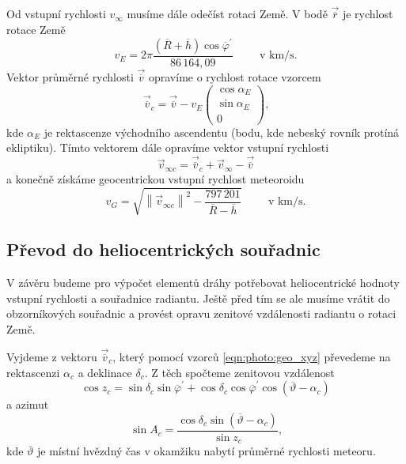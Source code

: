 Od vstupní rychlosti $v_\infty$ musíme dále odečíst rotaci Země. V bodě $\vec{\overline{r}}$ je rychlost rotace Země \cite{ceplecha}
\begin{equation}
    v_E=2\pi\frac{(\overline{R}+\overline{h})\cos{\overline{\varphi}^\prime}}{86\,164{,}09}\hspace{1cm}\text{v km/s.}
\end{equation}
Vektor průměrné rychlosti $\vec{\overline{v}}$ opravíme o rychlost rotace vzorcem \cite{ceplecha}
\begin{equation}
    \vec{\overline{v}}_c=\vec{\overline{v}}-v_E\begin{pmatrix}
        \cos{\alpha_E} \\
        \sin{\alpha_E} \\
        0
    \end{pmatrix}\text{,}
\end{equation}
kde $\alpha_E$ je rektascenze východního ascendentu (bodu, kde nebeský rovník protíná ekliptiku). Tímto vektorem dále opravíme vektor vstupní rychlosti \cite{ceplecha}
\begin{equation}
    \vec{v}_{\infty c}=\vec{\overline{v}}_c+\vec{v}_\infty-\vec{\overline{v}}
\end{equation}
a konečně získáme geocentrickou vstupní rychlost meteoroidu \cite{ceplecha}
\begin{equation}
    v_G=\sqrt{
        \left\lVert\vec{v}_{\infty c}\right\rVert^2-
        \frac{797\,201}{\overline{R}-\overline{h}}
    }\hspace{1cm}\text{v km/s.}
\end{equation}

\subsection{Převod do heliocentrických souřadnic}%
V závěru budeme pro výpočet elementů dráhy potřebovat heliocentrické hodnoty vstupní rychlosti a souřadnice radiantu. Ještě před tím se ale musíme vrátit do obzorníkových souřadnic a provést opravu zenitové vzdálenosti radiantu o rotaci Země.

Vyjdeme z vektoru $\vec{\overline{v}}_c$, který pomocí vzorců \eqref{eqn:photo:geo_xyz} převedeme na rektascenzi $\alpha_c$ a deklinace $\delta_c$. Z těch spočteme zenitovou vzdálenost \cite{ceplecha}
\begin{equation}
    \cos{z_c}=\sin{\delta_c}\sin{\overline{\varphi}^\prime}+\cos{\delta_c}\cos{\overline{\varphi}^\prime}\cos{(\overline{\vartheta}-\alpha_c)}
\end{equation}
a azimut
\begin{equation}
    \sin{A_c}=\frac{\cos{\delta_c}\sin{(\overline{\vartheta}-\alpha_c)}}{\sin{z_c}}\text{,}
\end{equation}
kde $\overline{\vartheta}$ je místní hvězdný čas v okamžiku nabytí průměrné rychlosti meteoru.

